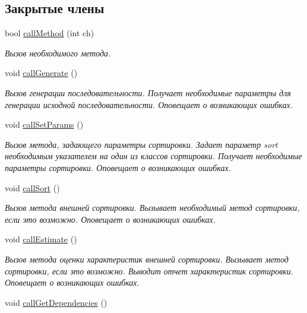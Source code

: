 \subsection*{Закрытые члены}
\begin{DoxyCompactItemize}
\item 
bool \hyperlink{class_user_interface_ad388ff348c0a124038f4ea9756b80041}{call\+Method} (int ch)
\begin{DoxyCompactList}\small\item\em Вызов необходимого метода. \end{DoxyCompactList}\item 
void \hyperlink{class_user_interface_a27c547dadfd5588d5b734e253b2e8a4a}{call\+Generate} ()
\begin{DoxyCompactList}\small\item\em Вызов генерации последовательности. Получает необходимые параметры для генерации исходной последовательности. Оповещает о возникающих ошибках. \end{DoxyCompactList}\item 
void \hyperlink{class_user_interface_adcabf6c8f2be4b4ec712c4674156bf59}{call\+Set\+Params} ()
\begin{DoxyCompactList}\small\item\em Вызов метода, задающего параметры сортировки. Задает параметр sort необходимым указателем на один из классов сортировки. Получает необходимые параметры сортировки. Оповещает о возникающих ошибках. \end{DoxyCompactList}\item 
void \hyperlink{class_user_interface_a0e03dfecee7e890ad1e076888062d5cb}{call\+Sort} ()
\begin{DoxyCompactList}\small\item\em Вызов метода внешней сортировки. Вызывает необходимый метод сортировки, если это возможно. Оповещает о возникающих ошибках. \end{DoxyCompactList}\item 
void \hyperlink{class_user_interface_a7957201b3543ea0561d48bcc0a0d329e}{call\+Estimate} ()
\begin{DoxyCompactList}\small\item\em Вызов метода оценки характеристик внешней сортировки. Вызывает метод сортировки, если это возможно. Выводит отчет характеристик сортировки. Оповещает о возникающих ошибках. \end{DoxyCompactList}\item 
void \hyperlink{class_user_interface_a332db63dca89d684f7e9e1272f4c3745}{call\+Get\+Dependencies} ()

\end{DoxyCompactItemize}
